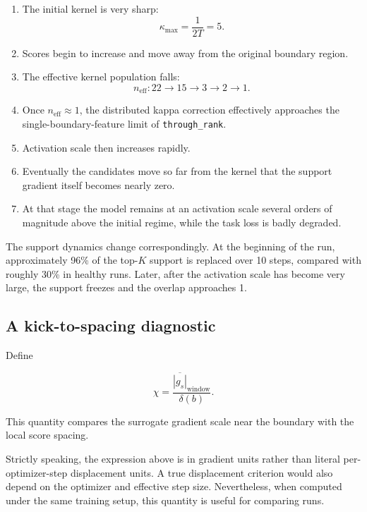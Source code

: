 \documentclass[11pt,a4paper]{article}
\newcommand{\code}[1]{\texttt{#1}}
\newcommand{\neff}{n_{\mathrm{eff}}}
\begin{document}
\begin{enumerate}[leftmargin=1.6em]

\item The initial kernel is very sharp:
\[
\kappa_{\max}
=
\frac{1}{2T}
=
5.
\]

\item Scores begin to increase and move away from the original boundary region.

\item The effective kernel population falls:
\[
\neff:22\to15\to3\to2\to1.
\]

\item Once \(\neff\approx1\), the distributed kappa correction effectively
approaches the single-boundary-feature limit of
\code{through\_rank}.

\item Activation scale then increases rapidly.

\item Eventually the candidates move so far from the kernel that the support
gradient itself becomes nearly zero.

\item At that stage the model remains at an activation scale several orders of
magnitude above the initial regime, while the task loss is badly degraded.

\end{enumerate}

The support dynamics change correspondingly.
At the beginning of the run, approximately 96\% of the top-\(K\) support is
replaced over 10 steps, compared with roughly 30\% in healthy runs.
Later, after the activation scale has become very large, the support freezes
and the overlap approaches 1.


\subsection*{A kick-to-spacing diagnostic}

Define

\[
\chi
=
\frac{
\overline{|g_s|}_{\mathrm{window}}
}{
\delta(b)
}.
\]

This quantity compares the surrogate gradient scale near the boundary with the
local score spacing.

Strictly speaking, the expression above is in gradient units rather than
literal per-optimizer-step displacement units.
A true displacement criterion would also depend on the optimizer and effective
step size.
Nevertheless, when computed under the same training setup, this quantity is
useful for comparing runs.
\end{document}
